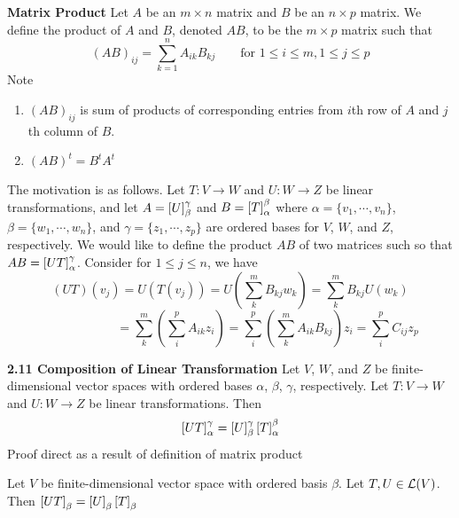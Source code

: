 \documentclass[11pt]{article}
\begin{document}
\begin{defn*} \textbf{Matrix Product}
    Let $A$ be an $m \times n$ matrix and $B$ be an $n\times p$ matrix. We define the product of $A$ and $B$, denoted $AB$, to be the $m\times p$ matrix such that 
    \[
        (AB)_{ij} = \sum_{k=1}^n A_{ik} B_{kj}
        \quad \quad 
        \text{for } 1 \leq i \leq m, 1 \leq j \leq p   
    \]
    Note 
    \begin{enumerate}
        \item $(AB)_{ij}$ is sum of products of corresponding entries from $i$th row of $A$ and $j$th column of $B$.
        \item $(AB)^t = B^t A^t$
    \end{enumerate}
    \begin{rem}
        The motivation is as follows. Let $T:V\to W$ and $U:W\to Z$ be linear transformations, and let $A = \left[ U \right]_{\beta}^{\gamma}$ and $B = \left[ T \right]_{\alpha}^{\beta}$ where $\alpha = \{v_1,\cdots, v_n\}$, $\beta = \{w_1,\cdots, w_n\}$, and $\gamma=\{z_1,\cdots, z_p\}$ are ordered bases for $V$, $W$, and $Z$, respectively. We would like to define the product $AB$ of two matrices such so that $AB = \left[ UT \right]_{\alpha}^{\gamma}$. Consider for $1\leq j \leq n$, we have
        \[
            (UT)(v_j) 
            = U(T(v_j))     
            = U\left( \sum_{k}^m B_{kj}w_k \right)
            = \sum_k^m B_{kj} U(w_k) 
        \]
        \[
            \quad \quad \quad \quad \quad \quad 
            = \sum_k^m \left( \sum_i^p A_{ik}z_i \right)
            = \sum_i^p \left( \sum_k^m A_{ik} B_{kj} \right) z_i 
            = \sum_i^p C_{ij}z_p        
        \]
    \end{rem}
\end{defn*}

\begin{theorem*}
    \textbf{2.11 Composition of Linear Transformation} Let $V$, $W$, and $Z$ be finite-dimensional vector spaces with ordered bases $\alpha$, $\beta$, $\gamma$, respectively. Let $T:V\to W$ and $U:W\to Z$ be linear transformations. Then 
    \[
        \left[ UT \right]_{\alpha}^{\gamma} = \left[ U \right]_{\beta}^{\gamma} \left[ T \right]_{\alpha}^{\beta}
    \]
    Proof direct as a result of definition of matrix product
\end{theorem*}


\begin{corollary*}
    Let $V$ be finite-dimensional vector space with ordered basis $\beta$. Let $T,U\in \mathcal{L}(V)$. Then $\left[ UT \right]_{\beta} = \left[ U \right]_{\beta} \left[ T \right]_{\beta}$
\end{corollary*}
\end{document}

